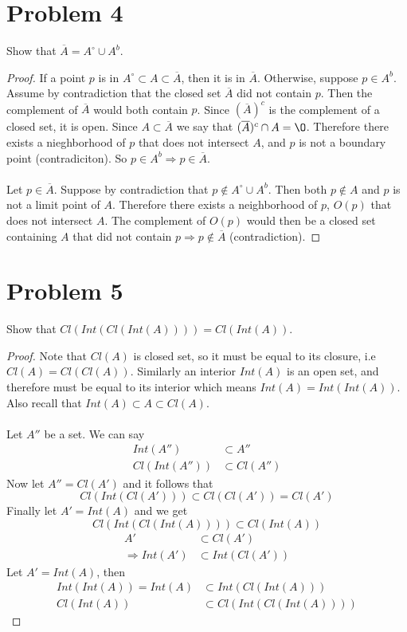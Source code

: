 \documentclass{article}
\begin{document}
\section*{Problem 4}
Show that $\overline{A} = A^\circ \cup A^b$.
\begin{proof}
     If a point $p$ is in $A^\circ \subset A \subset \overline{A}$, then it is in $\overline{A}$.
    Otherwise, suppose $p \in A^b$.
    Assume by contradiction that the closed set $\overline{A}$ did not contain $p$.
    Then the complement of $\overline{A}$ would both contain $p$.
    Since $(\overline{A})^c$ is the complement of a closed set, it is open.
    Since $A \subset \overline{A}$ we say that $(\overline{A})^c \cap A = \O$.
    Therefore there exists a nieghborhood of $p$ that does not intersect $A$, and $p$ is not a boundary point (contradiciton).
    So $p \in A^b \Longrightarrow p \in \overline{A}$.
    \\\\
    Let $p \in \overline{A}$.
    Suppose by contradiction that $p \notin A^\circ \cup A^b$.
    Then both $p \notin A$ and $p$ is not a limit point of $A$.
    Therefore there exists a neighborhood of $p$, $O(p)$ that does not intersect $A$.
    The complement of $O(p)$ would then be a closed set containing $A$ that did not contain $p \Longrightarrow p \notin \overline{A}$ (contradiction).
\end{proof}
\section*{Problem 5}
Show that $Cl(Int(Cl(Int(A)))) = Cl(Int(A))$.
\begin{proof}
    Note that $Cl(A)$ is closed set, so it must be equal to its closure, i.e $Cl(A) = Cl(Cl(A))$.
    Similarly an interior $Int(A)$ is an open set, and therefore must be equal to its interior which means $Int(A) = Int(Int(A))$.
    Also recall that $Int(A) \subset A \subset Cl(A)$.
    \\\\
    \fbox{$\subset$} Let $A''$ be a set.
    We can say 
    \begin{align*}
        Int(A'') & \subset A'' \\
        Cl(Int(A'')) & \subset Cl(A'')
    \end{align*}
    Now let $A'' = Cl(A')$ and it follows that
    \[        Cl(Int(Cl(A'))) \subset Cl(Cl(A')) = Cl(A')
    \]
    Finally let $A' = Int(A)$ and we get
    \[
        Cl(Int(Cl(Int(A)))) \subset Cl(Int(A))
    \]
    \fbox{$\supset$}
    \begin{align*}
        A' & \subset Cl(A') \\
        \Longrightarrow Int(A') & \subset Int(Cl(A'))
    \end{align*}
    Let $A' = Int(A)$, then
    \begin{align*}
        Int(Int(A)) = Int(A) & \subset Int(Cl(Int(A)))\\
        Cl(Int(A)) & \subset Cl(Int(Cl(Int(A))))
    \end{align*}
\end{proof}
\end{document}
